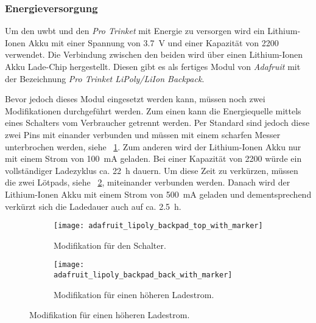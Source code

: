 %
%
\subsubsection{Energieversorgung}

Um den \Gls{uwbt} und den \textit{Pro Trinket} mit Energie zu versorgen wird ein Lithium-Ionen Akku mit einer Spannung von \SI{3.7}{\volt} und einer Kapazität von \SI{2200}{\mAh} verwendet. Die Verbindung zwischen den beiden wird über einen Lithium-Ionen Akku Lade-Chip hergestellt. Diesen gibt es als fertiges Modul von \textit{Adafruit} mit der Bezeichnung \textit{Pro Trinket LiPoly/LiIon Backpack}.

Bevor jedoch dieses Modul eingesetzt werden kann, müssen noch zwei Modifikationen durchgeführt werden. Zum einen kann die Energiequelle mittels eines Schalters vom Verbraucher getrennt werden. Per Standard sind jedoch diese zwei Pins mit einander verbunden und müssen mit einem scharfen Messer unterbrochen werden, siehe \figurename~\ref{fig:pro_trinket_liion_backpack_top}. Zum anderen wird der Lithium-Ionen Akku nur mit einem Strom von \SI{100}{\mA} geladen. Bei einer Kapazität von \SI{2200}{\mAh} würde ein vollständiger Ladezyklus ca. \SI{22}{\hour} dauern. Um diese Zeit zu verkürzen, müssen die zwei Lötpads, siehe \figurename~\ref{fig:pro_trinket_liion_backpack_bottom}, miteinander verbunden werden. Danach wird der Lithium-Ionen Akku mit einem Strom von \SI{500}{\mA} geladen und dementsprechend verkürzt sich die Ladedauer auch auf ca. \SI{2.5}{\hour}.

\begin{figure}
	\centering
	\begin{subfigure}[t]{0.25\linewidth}
		\texttt{[image: adafruit\_lipoly\_backpad\_top\_with\_marker]}
		\caption{Modifikation für den Schalter.}
		\label{fig:pro_trinket_liion_backpack_top}
	\end{subfigure}
	\qquad
	\begin{subfigure}[t]{0.25\linewidth}
		\texttt{[image: adafruit\_lipoly\_backpad\_back\_with\_marker]}
		\caption{Modifikation für einen höheren Ladestrom.}
		\label{fig:pro_trinket_liion_backpack_bottom}
	\end{subfigure}
	\label{fig:pro_trinket_liion_backpack}
\end{figure}

